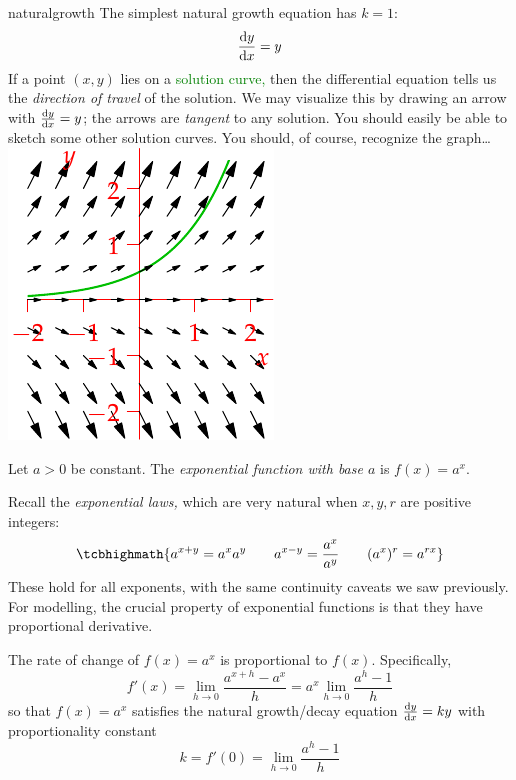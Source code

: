 \begin{example}[lower separated=false, sidebyside, sidebyside align=top seam, sidebyside gap=0pt, righthand width=0.28\linewidth]{}{naturalgrowth}
	The simplest natural growth equation has $k=1$:
	\[
		\diff[y]{x}=y
	\]
	If a point $(x,y)$ lies on a \textcolor{Green}{solution curve,} then the differential equation tells us the \emph{direction of travel} of the solution. We may visualize this by drawing an arrow with  $\diff[y]{x}=y$; the arrows are \emph{tangent} to any solution.\footnotemark{} You should easily be able to sketch some other solution curves.\smallbreak
	You should, of course, recognize the graph\ldots
	\tcblower
	\flushright\includegraphics[scale=1]{slopefields-01}
\end{example}



\begin{defn}{}{}
	Let $a>0$ be constant. The \emph{exponential function with base $a$} is $f(x)=a^x$.
\end{defn}

Recall the \emph{exponential laws,}\label{pg:explaws} which are very natural when $x,y,r$ are positive integers:
\[
	\tcbhighmath{a^{x+y}=a^xa^y\qquad 
	a^{x-y}=\frac{a^x}{a^y}\qquad 
	(a^x)^r=a^{rx}}
\]
These hold for all exponents, with the same continuity caveats we saw previously. 
For modelling, the crucial property of exponential functions is that they have proportional derivative.

\begin{thm}{}{}
	The rate of change of $f(x)=a^x$ is proportional to $f(x)$. Specifically,
	\[
		f'(x) =\lim_{h\to 0}\frac{a^{x+h}-a^x}h
		=a^x\lim_{h\to 0}\frac{a^{h}-1}h
	\]
	so that $f(x)=a^x$ satisfies the natural growth/decay equation $\diff[y]{x}=ky$ with proportionality constant
	\[
		k =f'(0) =\lim_{h\to 0}\frac{a^{h}-1}h
	\]
\end{thm}


